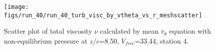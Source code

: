 \begin{figure}[H]
\centering
\texttt{[image: figs/run\_40/run\_40\_turb\_visc\_by\_vtheta\_vs\_r\_meshscatter]}
\caption{Scatter plot of total viscosity $\nu$ calculated by mean $\bar{v}_{\theta}$ equation with non-equilibrium pressure at $z/c$=8.50, $V_{free}$=33.44, station 4.}
\label{fig:run_40_turb_visc_by_vtheta_vs_r_meshscatter}
\end{figure}


